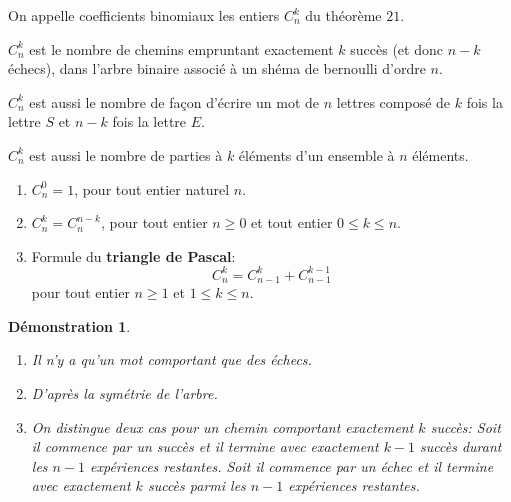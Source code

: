 \documentclass[a4paper,11pt]{article}
\theoremstyle{break}
\newcounter{enonce}
\newtheorem{demonstration}[enonce]{Démonstration}
\begin{document}
\begin{definition}
 On appelle coefficients binomiaux les entiers $C_n^k$ du théorème $21$.
 
 $C_n^k$ est le nombre de chemins empruntant exactement $k$ succès (et donc $n-k$ échecs),
 dans l'arbre binaire associé à un shéma de bernoulli d'ordre $n$.
 
 $C_n^k$ est aussi le nombre de façon d'écrire un mot de $n$ lettres composé de $k$ fois la 
 lettre $S$ et $n-k$ fois la lettre $E$.
 
 $C_n^k$ est aussi le nombre de parties à $k$ éléments d'un ensemble à $n$ éléments.
\end{definition}



 \begin{proposition}
  \begin{enumerate}
   \item $C_n^0=1$, pour tout entier naturel $n$.
   \item $C_n^k=C_n^{n-k}$, pour tout entier $n \geq 0$ et tout entier $0\leq k \leq n$. 
   \item Formule du \textbf{triangle de Pascal}:
   $$C_n^k=C_{n-1}^k+C_{n-1}^{k-1}$$ pour tout entier $n \geq 1$ et $1 \leq k \leq n$.
  \end{enumerate}

 \end{proposition}

 

 \begin{demonstration}
 
 \begin{enumerate}
   \item Il n'y a qu'un mot comportant que des échecs.
   \item D'après la symétrie de l'arbre.
   \item On distingue deux cas pour un chemin comportant exactement $k$
   succès: Soit il commence par un succès et il termine avec exactement $k-1$ succès durant les
   $n-1$ expériences restantes. Soit il commence par un échec et il termine avec exactement $k$ succès
   parmi les $n-1$ expériences restantes. 
  \end{enumerate}
  
 \end{demonstration}




   
   
\end{document}
